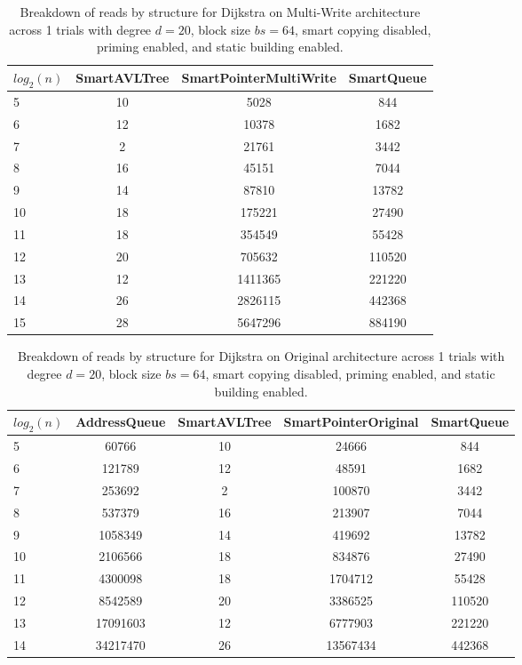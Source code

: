\begin{table}[]
\centering
\begin{tabular}{|l|c|c|c|}
$log_2(n)$ & SmartAVLTree & SmartPointerMultiWrite & SmartQueue \\ \hline
5 & 10 & 5028 & 844 \\ \hline
6 & 12 & 10378 & 1682 \\ \hline
7 & 2 & 21761 & 3442 \\ \hline
8 & 16 & 45151 & 7044 \\ \hline
9 & 14 & 87810 & 13782 \\ \hline
10 & 18 & 175221 & 27490 \\ \hline
11 & 18 & 354549 & 55428 \\ \hline
12 & 20 & 705632 & 110520 \\ \hline
13 & 12 & 1411365 & 221220 \\ \hline
14 & 26 & 2826115 & 442368 \\ \hline
15 & 28 & 5647296 & 884190 \\ \hline
\end{tabular}
\caption{Breakdown of reads by structure for Dijkstra on Multi-Write architecture across 1 trials with degree $d=20$, block size $bs=64$, smart copying disabled, priming enabled, and static building enabled.}
    \label{tab:reads_by_structure_dijkstra_d20_bs64_trials1_copiesfalse_primetrue_staticinsertiontrue_ptmultiwrite_movetrue}
\end{table}

\begin{table}[]
\centering
\begin{tabular}{|l|c|c|c|c|}
$log_2(n)$ & AddressQueue & SmartAVLTree & SmartPointerOriginal & SmartQueue \\ \hline
5 & 60766 & 10 & 24666 & 844 \\ \hline
6 & 121789 & 12 & 48591 & 1682 \\ \hline
7 & 253692 & 2 & 100870 & 3442 \\ \hline
8 & 537379 & 16 & 213907 & 7044 \\ \hline
9 & 1058349 & 14 & 419692 & 13782 \\ \hline
10 & 2106566 & 18 & 834876 & 27490 \\ \hline
11 & 4300098 & 18 & 1704712 & 55428 \\ \hline
12 & 8542589 & 20 & 3386525 & 110520 \\ \hline
13 & 17091603 & 12 & 6777903 & 221220 \\ \hline
14 & 34217470 & 26 & 13567434 & 442368 \\ \hline
\end{tabular}
\caption{Breakdown of reads by structure for Dijkstra on Original architecture across 1 trials with degree $d=20$, block size $bs=64$, smart copying disabled, priming enabled, and static building enabled.}
    \label{tab:reads_by_structure_dijkstra_d20_bs64_trials1_copiesfalse_primetrue_staticinsertiontrue_ptoriginal_movefalse}
\end{table}

